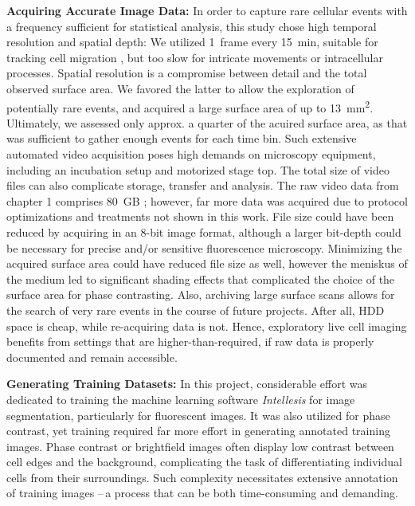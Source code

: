 %
\label{sec:discussion_quantifying_microscopy}%

\textbf{Acquiring Accurate Image Data:}
In order to capture rare cellular events with a frequency sufficient for
statistical analysis, this study chose high temporal resolution and spatial
depth: We utilized \SI{1}{frame} every \SI{15}{\minute}, suitable for tracking
cell migration \cite{huthSignificantlyImprovedPrecision2010}, but too slow for
intricate movements or intracellular processes. Spatial resolution is a
compromise between detail and the total observed surface area. We favored the
latter to allow the exploration of potentially rare events, and acquired a
 large surface area of up to
\SI{13}{\milli\meter\squared}. Ultimately, we assessed only approx. a quarter of
the acuired surface area, as that was sufficient to gather enough events for
each time bin. Such extensive automated video acquisition poses high demands on
microscopy equipment, including an incubation setup and motorized stage top. The
total size of video files can also complicate storage, transfer and analysis.
The raw video data from chapter 1 comprises \SI{80}{GB}
\cite{biostudiesBioStudiesEuropeanBioinformatics}; however, far more data was
acquired due to protocol optimizations and treatments not shown in this work.
File size could have been reduced by acquiring in an 8-bit image format,
although a larger bit-depth could be necessary for precise and/or sensitive
fluorescence microscopy. Minimizing the acquired surface area could have reduced
file size as well, however the meniskus of the medium led to significant shading
effects that complicated the choice of the surface area for phase contrasting.
Also, archiving large surface scans allows for the search of very rare events in
the course of future projects. After all, HDD space is cheap, while re-acquiring
data is not. Hence, exploratory live cell imaging benefits from settings that
are higher-than-required, if raw data is properly documented and remain
accessible.



\textbf{Generating Training Datasets:}
In this project, considerable effort was dedicated to training the machine
learning software \textit{Intellesis} for image segmentation, particularly for
fluorescent images. It was also utilized for phase contrast, yet training
required far more effort in generating annotated training images. Phase contrast
or brightfield images often display low contrast between cell edges and the
background, complicating the task of differentiating individual cells from their
surroundings. Such complexity necessitates extensive annotation of training
images --\,a process that can be both time-consuming and demanding.

